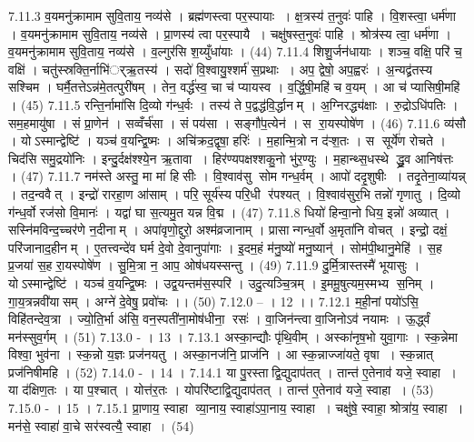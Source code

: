 7.11.3
व॒यमनु॑क्रामाम सुवि॒ताय॒ नव्य॑से । ब्रह्म॑णस्त्वा पर॒स्पायाः । क्ष॒त्रस्य॑ त॒नुवः॑ पाहि । वि॒शस्त्वा॒ धर्म॑णा । व॒यमनु॑क्रामाम सुवि॒ताय॒ नव्य॑से । प्रा॒णस्य॑ त्वा पर॒स्पायै । चक्षु॑षस्त॒नुवः॑ पाहि । श्रोत्र॑स्य त्वा॒ धर्म॑णा । व॒यमनु॑क्रामाम सुवि॒ताय॒ नव्य॑से । व॒ल्गुर॑सि श॒य्युँधा॑याः । (44)
7.11.4
शिशु॒र्जन॑धायाः । शञ्च॒ वक्षि॒ परि॑ च॒ वक्षि॑ । चतु॑स्स्रक्ति॒र्नाभि॑र््ऋ॒तस्य॑ । सदो॑ वि॒श्वायु॒श्शर्म॑ स॒प्रथाः । अप॒ द्वेषो॒ अप॒ह्वरः॑ । अ॒न्यद्व्र॑तस्य सश्चिम । घर्मै॒तत्तेऽन्न॑मे॒तत्पुरी॑षम् । तेन॒ वर्द्ध॑स्व॒ चा च॑ प्यायस्व । व॒र्द्धि॒षी॒महि॑ च व॒यम् । आ च॑ प्यासिषी॒महि॑ । (45)
7.11.5
रन्ति॒र्नामा॑सि दि॒व्यो ग॑न्ध॒र्वः । तस्य॑ ते प॒द्वद्ध॑वि॒र्द्धानम् । अ॒ग्निरद्ध्य॑क्षाः । रु॒द्रोऽधि॑पतिः । सम॒हमायु॑षा । सं प्रा॒णेन॑ । सव्वँर्च॑सा । सं पय॑सा । सङ्गौ॑प॒त्येन॑ । स रा॒यस्पोषे॑ण । (46)
7.11.6
व्य॑सौ । योऽस्मान्द्वेष्टि॑ । यञ्च॑ व॒यन्द्वि॒ष्मः । अचि॑क्रद॒द्वृषा॒ हरिः॑ । म॒हान्मि॒त्रो न द॑ऱ्श॒तः । स सूर्ये॑ण रोचते । चिद॑सि समु॒द्रयो॑निः । इन्दु॒र्दक्ष॑श्श्ये॒न ऋ॒तावा । हिर॑ण्यपक्षश्शकु॒नो भु॑र॒ण्युः । म॒हान्थ्स॒धस्थे द्ध्रु॒व आनिष॑त्तः । (47)
7.11.7
नम॑स्ते अस्तु॒ मा मा॑ हिसीः । वि॒श्वाव॑सु सोम गन्ध॒र्वम् । आपो॑ ददृ॒शुषीः । तदृ॒तेना॒व्या॑यन्न् । तद॒न्ववैत् । इन्द्रो॑ रारहा॒ण आ॑साम् । परि॒ सूर्य॑स्य परि॒धी र॑पश्यत् । वि॒श्वाव॑सुर॒भि तन्नो॑ गृणातु । दि॒व्यो ग॑न्ध॒र्वो रज॑सो वि॒मानः॑ । यद्वा॑ घा स॒त्यमु॒त यन्न वि॒द्म । (47)
7.11.8
धियो॑ हिन्वा॒नो धिय॒ इन्नो॑ अव्यात् । सस्नि॑मविन्द॒च्चर॑णे न॒दीनाम् । अपा॑वृणो॒द्दुरो॒ अश्म॑व्रजानाम् । प्रासान्गन्ध॒र्वो अ॒मृता॑नि वोचत् । इन्द्रो॒ दक्षं॒ परि॑जानाद॒हीनम् । ए॒तत्त्वन्दे॑व घर्म दे॒वो दे॒वानुपा॑गाः । इ॒दम॒हं म॑नु॒ष्यो॑ मनु॒ष्यान्॑ । सोम॑पी॒थानु॒मेहि॑ । स॒ह प्र॒जया॑ स॒ह रा॒यस्पोषे॑ण । सु॒मि॒त्रा न॒ आप॒ ओष॑धयस्सन्तु । (49)
7.11.9
दु॒र्मि॒त्रास्तस्मै॑ भूयासुः । योऽस्मान्द्वेष्टि॑ । यञ्च॑ व॒यन्द्वि॒ष्मः । उद्व॒यन्तम॑स॒स्परि॑ । उदु॒त्यञ्चि॒त्रम् । इ॒ममू॒षुत्यम॒स्मभ्य॑ स॒निम् । गा॒य॒त्रन्नवी॑यासम् । अग्ने॑ दे॒वेषु॒ प्रवो॑चः ।। (50)
7.12.0
-- । 12 ।।
7.12.1
म॒ही॒नां पयो॑ऽसि॒ विहि॑तन्देव॒त्रा । ज्यो॒ति॒र्भा अ॑सि॒ वन॒स्पती॑ना॒मोष॑धीना॒॒ रसः॑ । वा॒जिन॑न्त्वा वा॒जिनोऽव॑ नयामः । ऊ॒र्द्ध्वं मन॑स्सुव॒र्गम् । (51)
7.13.0
- । 13 ।
7.13.1
अस्का॒न्द्यौः पृ॑थि॒वीम् । अस्का॑नृष॒भो युवा॒गाः । स्क॒न्नेमा विश्वा॒ भुव॑ना । स्क॒न्नो य॒ज्ञः प्रज॑नयतु । अस्का॒नज॑नि॒ प्राज॑नि । आ स्क॒न्नाज्जा॑यते॒ वृषा । स्क॒न्नात् प्रज॑निषीमहि । (52)
7.14.0
- । 14 ।
7.14.1
या पु॒रस्ताद्वि॒द्युदाप॑तत् । तान्त॑ ए॒तेनाव॑ यजे॒ स्वाहा । या द॑क्षिण॒तः । या प॒श्चात् । योत्त॑र॒तः । योपरि॑ष्टाद्वि॒द्युदाप॑तत् । तान्त॑ ए॒तेनाव॑ यजे॒ स्वाहा । (53)
7.15.0
- । 15 ।
7.15.1
प्रा॒णाय॒ स्वाहा व्या॒नाय॒ स्वाहा॑ऽपा॒नाय॒ स्वाहा । चक्षु॑षे॒ स्वाहा॒ श्रोत्रा॑य॒ स्वाहा । मन॑से॒ स्वाहा॑ वा॒चे सर॑स्वत्यै॒ स्वाहा । (54)

